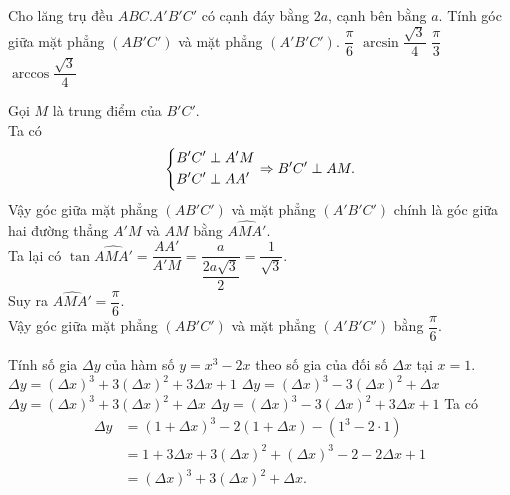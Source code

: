 \begin{ex}%
 Cho lăng trụ đều $ABC.A'B'C'$ có cạnh đáy bằng $2a$, cạnh bên bằng $a$. Tính góc giữa mặt phẳng $(AB'C')$ và mặt phẳng $(A'B'C')$.
 \choice
  {\True $\dfrac{\pi}{6}$}
  {$\arcsin \dfrac{\sqrt{3}}{4}$}
  {$\dfrac{\pi}{3}$}
  {$\arccos \dfrac{\sqrt{3}}{4}$}
 \loigiai
  {
  \immini
  {
  Gọi $M$ là trung điểm của $B'C'$.\\
  Ta có
  \begin{align*}
   \left\{\begin{aligned}& B'C' \perp A'M \\& B'C' \perp AA'\end{aligned}\right. \Rightarrow B'C' \perp AM.
  \end{align*}
  Vậy góc giữa mặt phẳng $(AB'C')$ và mặt phẳng $(A'B'C')$ chính là góc giữa hai đường thẳng $A'M$ và $AM$ bằng $\widehat{AMA'}$.\\
  Ta lại có $\tan \widehat{AMA'} = \dfrac{AA'}{A'M} = \dfrac{a}{\dfrac{2a \sqrt{3}}{2}} = \dfrac{1}{\sqrt{3}}$.\\
  Suy ra $\widehat{AMA'} = \dfrac{\pi}{6}$.\\
  Vậy góc giữa mặt phẳng $(AB'C')$ và mặt phẳng $(A'B'C')$ bằng $\dfrac{\pi}{6}$.
  }
  {
  }
  }
\end{ex}


\begin{ex}%
 Tính số gia $\Delta y$ của hàm số $y = x^3 - 2x$ theo số gia của đối số $\Delta x$ tại $x = 1$.
 \choice
  {$\Delta y = (\Delta x)^3 + 3 (\Delta x)^2 + 3 \Delta x + 1$}
  {$\Delta y = (\Delta x)^3 - 3 (\Delta x)^2 + \Delta x$}
  {\True $\Delta y = (\Delta x)^3 + 3 (\Delta x)^2 + \Delta x$}
  {$\Delta y = (\Delta x)^3 - 3 (\Delta x)^2 + 3 \Delta x + 1$}
 \loigiai
  {
  Ta có
  \begin{align*}
   \Delta y & = \left(1 + \Delta x \right)^3 - 2(1 + \Delta x) - (1^3 - 2 \cdot 1) \\
            & = 1 + 3 \Delta x + 3 (\Delta x)^2 + (\Delta x)^3 - 2 - 2\Delta x + 1 \\
            & = (\Delta x)^3 + 3 (\Delta x)^2 + \Delta x.
  \end{align*}
  }
\end{ex}


